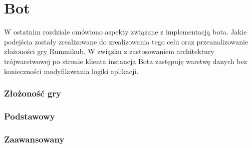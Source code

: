 \chapter{Bot}
\thispagestyle{chapterBeginStyle}

W ostatnim rozdziale omówiono aspekty związane z implementacją bota. Jakie podejścia zostały zrealizowane do zrealizowania tego celu oraz przeanalizowanie złożoności gry Rummikub. W związku z zastosowaniem architektury trójwarstwowej po stronie klienta instancja Bota zastępuję warstwę danych bez konieczności modyfikowania logiki aplikacji.

\subsection{Złożoność gry}


\subsection{Podstawowy}



\subsection{Zaawansowany}




